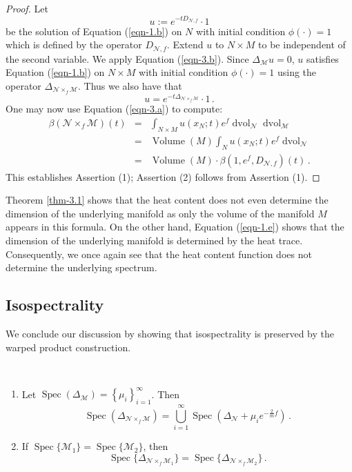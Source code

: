 \documentclass{amsart}
\begin{document}
\begin{proof} Let
$$u:=e^{-tD_{\mathcal{N},f}}\cdot1$$ be the solution of Equation (\ref{eqn-1.b}) on
$N$ with initial condition
$\phi(\cdot)=1$ which is defined by the operator $D_{\mathcal{N},f}$. Extend
$u$ to $N\times M$ to be independent of the second variable. We apply Equation (\ref{eqn-3.b}). Since
$\Delta_{\mathcal{M}}u=0$, $u$ satisfies Equation (\ref{eqn-1.b}) on $N\times M$ with
initial condition $\phi(\cdot)=1$ using the operator $\Delta_{\mathcal{N}\times_f\mathcal{M}}$. Thus we also
have that
$$u=e^{-t\Delta_{\mathcal{N}\times_f\mathcal{M}}}\cdot1\,.$$
One may now use Equation (\ref{eqn-3.a}) to compute:
\begin{eqnarray*}
\beta(\mathcal{N}\times_f\mathcal{M})(t)
&=&\int_{N\times M}u(x_N;t)e^f\operatorname{dvol}_{\mathcal{N}}\operatorname{dvol}_{\mathcal{M}}\\
&=&\operatorname{Volume}(M)\int_Nu(x_N;t)e^f\operatorname{dvol}_{\mathcal{N}}\\
&=&\operatorname{Volume}(M)\cdot\beta(1,e^f,D_{\mathcal{N},f})(t)\,.
\end{eqnarray*}
This establishes Assertion (1); Assertion (2) follows from Assertion (1).
\end{proof}

Theorem \ref{thm-3.1} shows that the heat content does not even determine the dimension of the underlying
manifold as only the volume of the manifold $M$ appears in this formula. On the other hand, Equation
(\ref{eqn-1.e}) shows that the dimension of the underlying manifold is determined by the heat trace.
Consequently, we once again see that the heat content function does not determine the underlying spectrum.

\subsection{Isospectrality}
We conclude our discussion by showing that isospectrality is preserved by the warped product construction.

\begin{theorem}\label{thm-3.2}\ 
\begin{enumerate}
\item Let $\displaystyle\operatorname{Spec}(\Delta_{\mathcal{M}})=\left\{\mu_i\right\}_{i=1}^\infty$. Then
 $$\operatorname{Spec}\left(\Delta_{\mathcal{N}\times_f\mathcal{M}}\right)=\bigcup_{i=1}^\infty
\operatorname{Spec}\left(\Delta_{\mathcal{N}}+\mu_ie^{-\frac2mf}\right)\,.$$
\item  If
$\operatorname{Spec}\{\mathcal{M}_1\}=\operatorname{Spec}\{\mathcal{M}_2\}$, then
$$
\operatorname{Spec}\{\Delta_{\mathcal{N}\times_f\mathcal{M}_1}\}=
\operatorname{Spec}\{\Delta_{\mathcal{N}\times_f\mathcal{M}_2}\}\,.
$$
\end{enumerate}
\end{theorem}
\end{document}
